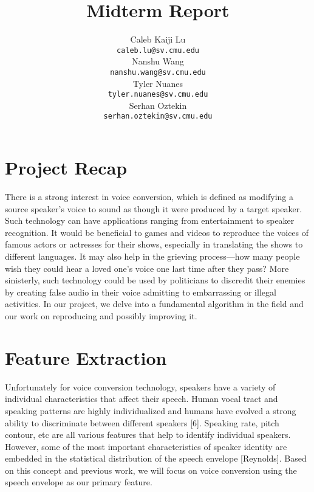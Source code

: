 \documentclass{article}
\title{Midterm Report}
\author{
  Caleb Kaiji Lu\\
  \texttt{caleb.lu@sv.cmu.edu} \\
  \And
  Nanshu Wang\\
  \texttt{nanshu.wang@sv.cmu.edu} \\
   \And
  Tyler Nuanes\\
  \texttt{tyler.nuanes@sv.cmu.edu} \\
  \And
   Serhan Oztekin\\
  \texttt{serhan.oztekin@sv.cmu.edu} \\
}
\begin{document}

\maketitle



\section{Project Recap}

There is a strong interest in voice conversion, which is defined as modifying a source speaker's voice to sound as though it were produced by a target speaker. Such technology can have applications ranging from entertainment to speaker recognition. It would be beneficial to games and videos to reproduce the voices of famous actors or actresses for their shows, especially in translating the shows to different languages. It may also help in the grieving process---how many people wish they could hear a loved one's voice one last time after they pass? More sinisterly, such technology could be used by politicians to discredit their enemies by creating false audio in their voice admitting to embarrassing or illegal activities. In our project, we delve into a fundamental algorithm in the field and our work on reproducing and possibly improving it.

\section{Feature Extraction}
Unfortunately for voice conversion technology, speakers have a variety of individual characteristics that affect their speech. Human vocal tract and speaking patterns are highly individualized and humans have evolved a strong ability to discriminate between different speakers [6].  Speaking rate, pitch contour, etc are all various features that help to identify individual speakers. However, some of the most important characteristics of speaker identity are embedded in the statistical distribution of the speech envelope [Reynolds]. Based on this concept and previous work, we will focus on voice conversion using the speech envelope as our primary feature.
 
\end{document}
